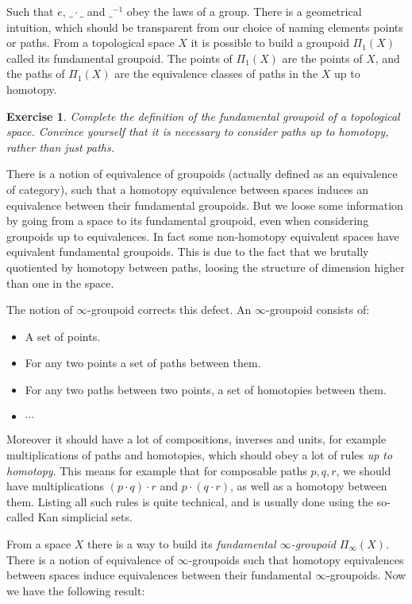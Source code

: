 \documentclass{article}
\newtheorem{exercise}{Exercise}
\begin{document}
Such that $e$, $\_\cdot\_$ and $\_^{-1}$ obey the laws of a group. There is a geometrical intuition, which should be transparent from our choice of naming elements points or paths. From a topological space $X$ it is possible to build a groupoid $\Pi_1(X)$ called its fundamental groupoid. The points of $\Pi_1(X)$ are the points of $X$, and the paths of $\Pi_1(X)$ are the equivalence classes of paths in the $X$ up to homotopy.

\begin{exercise}
Complete the definition of the fundamental groupoid of a topological space. Convince yourself that it is necessary to consider paths up to homotopy, rather than just paths.
\end{exercise}

There is a notion of equivalence of groupoids (actually defined as an equivalence of category), such that a homotopy equivalence between spaces induces an equivalence between their fundamental groupoids. But we loose some information by going from a space to its fundamental groupoid, even when considering groupoids up to equivalences. In fact some non-homotopy equivalent spaces have equivalent fundamental groupoids. This is due to the fact that we brutally quotiented by homotopy between paths, loosing the structure of dimension higher than one in the space.%

The notion of $\infty$-groupoid corrects this defect. An $\infty$-groupoid consists of:
\begin{itemize}
\item A set of points.
\item For any two points a set of paths between them.
\item For any two paths between two points, a set of homotopies between them.
\item $\cdots$
\end{itemize}
Moreover it should have a lot of compositions, inverses and units, for example multiplications of paths and homotopies, which should obey a lot of rules \emph{up to homotopy}. This means for example that for composable paths $p,q,r$, we should have multiplications $(p\cdot q)\cdot r$ and $p\cdot(q\cdot r)$, as well as a homotopy between them. Listing all such rules is quite technical, and is usually done using the so-called Kan simplicial sets. 

From a space $X$ there is a way to build its \emph{fundamental $\infty$-groupoid} $\Pi_\infty(X)$. There is a notion of equivalence of $\infty$-groupoids such that homotopy equivalences between spaces induce equivalences between their fundamental $\infty$-groupoids. Now we have the following result:
\end{document}
